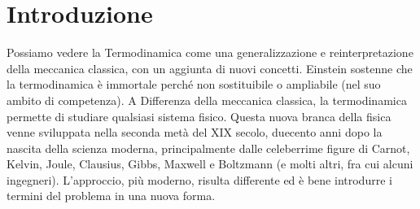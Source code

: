 \documentclass[
10pt, %
a4paper, %
oneside, %
headinclude,footinclude, %
BCOR5mm, %
]{scrartcl}
\begin{document}
\setcounter{tocdepth}{2} %






\newpage %
\tableofcontents %
\newpage

\section{Introduzione}
Possiamo vedere la Termodinamica come una generalizzazione e reinterpretazione della meccanica classica, con un aggiunta di nuovi concetti. Einstein sostenne che la termodinamica è immortale perché non sostituibile o ampliabile (nel suo ambito di competenza). A Differenza della meccanica classica, la termodinamica permette di studiare qualsiasi sistema fisico. Questa nuova branca della fisica venne sviluppata nella seconda metà del XIX secolo, duecento anni dopo la nascita della scienza moderna, principalmente dalle celeberrime figure di Carnot, Kelvin, Joule, Clausius, Gibbs, Maxwell e Boltzmann (e molti altri, fra cui alcuni ingegneri). L'approccio, più moderno, risulta differente ed è bene introdurre i termini del problema in una nuova forma.\\
\end{document}
